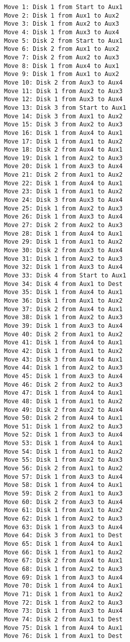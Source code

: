 \documentclass[11pt]{article}
\begin{document}
\begin{multicols}{2}
\begin{Verbatim}[fontsize=\small]
Move 1: Disk 1 from Start to Aux1
Move 2: Disk 1 from Aux1 to Aux2
Move 3: Disk 1 from Aux2 to Aux3
Move 4: Disk 1 from Aux3 to Aux4
Move 5: Disk 2 from Start to Aux1
Move 6: Disk 2 from Aux1 to Aux2
Move 7: Disk 2 from Aux2 to Aux3
Move 8: Disk 1 from Aux4 to Aux1
Move 9: Disk 1 from Aux1 to Aux2
Move 10: Disk 2 from Aux3 to Aux4
Move 11: Disk 1 from Aux2 to Aux3
Move 12: Disk 1 from Aux3 to Aux4
Move 13: Disk 3 from Start to Aux1
Move 14: Disk 3 from Aux1 to Aux2
Move 15: Disk 3 from Aux2 to Aux3
Move 16: Disk 1 from Aux4 to Aux1
Move 17: Disk 1 from Aux1 to Aux2
Move 18: Disk 2 from Aux4 to Aux1
Move 19: Disk 1 from Aux2 to Aux3
Move 20: Disk 1 from Aux3 to Aux4
Move 21: Disk 2 from Aux1 to Aux2
Move 22: Disk 1 from Aux4 to Aux1
Move 23: Disk 1 from Aux1 to Aux2
Move 24: Disk 3 from Aux3 to Aux4
Move 25: Disk 1 from Aux2 to Aux3
Move 26: Disk 1 from Aux3 to Aux4
Move 27: Disk 2 from Aux2 to Aux3
Move 28: Disk 1 from Aux4 to Aux1
Move 29: Disk 1 from Aux1 to Aux2
Move 30: Disk 2 from Aux3 to Aux4
Move 31: Disk 1 from Aux2 to Aux3
Move 32: Disk 1 from Aux3 to Aux4
Move 33: Disk 4 from Start to Aux1
Move 34: Disk 4 from Aux1 to Dest
Move 35: Disk 1 from Aux4 to Aux1
Move 36: Disk 1 from Aux1 to Aux2
Move 37: Disk 2 from Aux4 to Aux1
Move 38: Disk 1 from Aux2 to Aux3
Move 39: Disk 1 from Aux3 to Aux4
Move 40: Disk 2 from Aux1 to Aux2
Move 41: Disk 1 from Aux4 to Aux1
Move 42: Disk 1 from Aux1 to Aux2
Move 43: Disk 3 from Aux4 to Aux1
Move 44: Disk 1 from Aux2 to Aux3
Move 45: Disk 1 from Aux3 to Aux4
Move 46: Disk 2 from Aux2 to Aux3
Move 47: Disk 1 from Aux4 to Aux1
Move 48: Disk 1 from Aux1 to Aux2
Move 49: Disk 2 from Aux2 to Aux4
Move 50: Disk 2 from Aux4 to Aux1
Move 51: Disk 1 from Aux2 to Aux3
Move 52: Disk 1 from Aux3 to Aux4
Move 53: Disk 1 from Aux4 to Aux1
Move 54: Disk 1 from Aux1 to Aux2
Move 55: Disk 1 from Aux2 to Aux3
Move 56: Disk 2 from Aux1 to Aux2
Move 57: Disk 1 from Aux3 to Aux4
Move 58: Disk 1 from Aux4 to Aux1
Move 59: Disk 2 from Aux1 to Aux3
Move 60: Disk 2 from Aux3 to Aux4
Move 61: Disk 1 from Aux1 to Aux2
Move 62: Disk 1 from Aux2 to Aux3
Move 63: Disk 1 from Aux3 to Aux4
Move 64: Disk 3 from Aux1 to Dest
Move 65: Disk 1 from Aux4 to Aux1
Move 66: Disk 1 from Aux1 to Aux2
Move 67: Disk 2 from Aux4 to Aux1
Move 68: Disk 1 from Aux2 to Aux3
Move 69: Disk 1 from Aux3 to Aux4
Move 70: Disk 1 from Aux4 to Aux1
Move 71: Disk 1 from Aux1 to Aux2
Move 72: Disk 1 from Aux2 to Aux3
Move 73: Disk 1 from Aux3 to Aux4
Move 74: Disk 2 from Aux1 to Dest
Move 75: Disk 1 from Aux4 to Aux1
Move 76: Disk 1 from Aux1 to Dest
\end{Verbatim}


\end{multicols}
\end{document}
